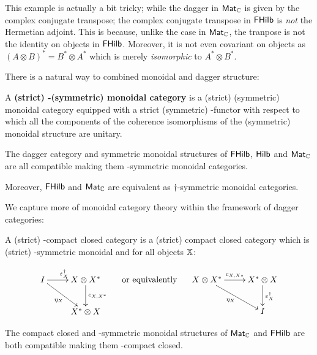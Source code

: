 This example is actually a bit tricky; while the dagger in $\mathsf{Mat}_{\mathbb{C}}$ is given by the complex conjugate transpose; the complex conjugate transpose in $\mathsf{FHilb}$ is {\em not } the Hermetian adjoint.  This is because, unlike the case in $\mathsf{Mat}_{\mathbb{C}}$, the tranpose is not the identity on objects in $\mathsf{FHilb}$.  Moreover, it is not even covariant on objects as  $(A\otimes B)^* = B^*\otimes A^*$ which is merely {\em isomorphic} to  $A^*\otimes B^*$.





There is a natural way to combined monoidal and dagger structure:

\begin{definition}
A {\bf  (strict) \dag-(symmetric) monoidal category} is a (strict) (symmetric) monoidal category equipped with a strict (symmetric) \dag-functor with respect to which all the components of the  coherence isomorphisms of the (symmetric) monoidal structure are unitary.
\end{definition}



\begin{example}
The dagger category and symmetric monoidal structures of $\mathsf{FHilb}$, $\mathsf{Hilb}$ and $\mathsf{Mat}_{\mathbb{C}}$ are all compatible making them \dag-symmetric monoidal categories.

Moreover, $\mathsf{FHilb}$ and $\mathsf{Mat}_{\mathbb{C}}$  are equivalent as $\dag$-symmetric monoidal categories.
\end{example}


We capture more of monoidal category theory within the framework of dagger categories:

\begin{definition}
A {(strict) \dag-compact closed category} is a (strict) compact closed category which is (strict) \dag-symmetric monoidal and for all objects $\mathbb{X}$:

$$
\xymatrix{
I \ar[r]^{\epsilon_X^\dag} \ar[dr]_{\eta_X}   &  X\otimes X^* \ar[d]^{c_{X,X^*}}\\
 &  X^* \otimes X 
}
\hspace*{.5cm}
\text{or equivalently}
\hspace*{.5cm}
\xymatrix{
X\otimes X^* \ar[dr]_{\eta_X} \ar[r]^{c_{X,X*}}
 & X^* \otimes X  \ar[d]^{\epsilon_X^\dag}\\
& I
}
$$
\end{definition}

\begin{example}
The compact closed and \dag-symmetric monoidal structures of $\mathsf{Mat}_{\mathbb{C}}$ and $\mathsf{FHilb}$ are both compatible making them \dag-compact closed.
\end{example}

